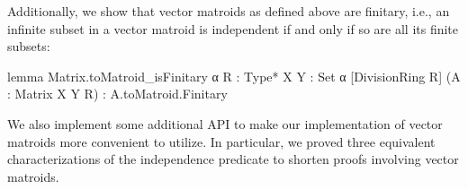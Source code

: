 Additionally, we show that vector matroids as defined above are finitary, i.e., an infinite subset in a vector matroid is independent if and only if so are all its finite subsets:
\begin{leancode}
lemma Matrix.toMatroid_isFinitary {α R : Type*}
    {X Y : Set α} [DivisionRing R]
    (A : Matrix X Y R) :
    A.toMatroid.Finitary
\end{leancode}

We also implement some additional API to make our implementation of vector matroids more convenient to utilize. In particular, we proved three equivalent characterizations of the independence predicate to shorten proofs involving vector matroids.
